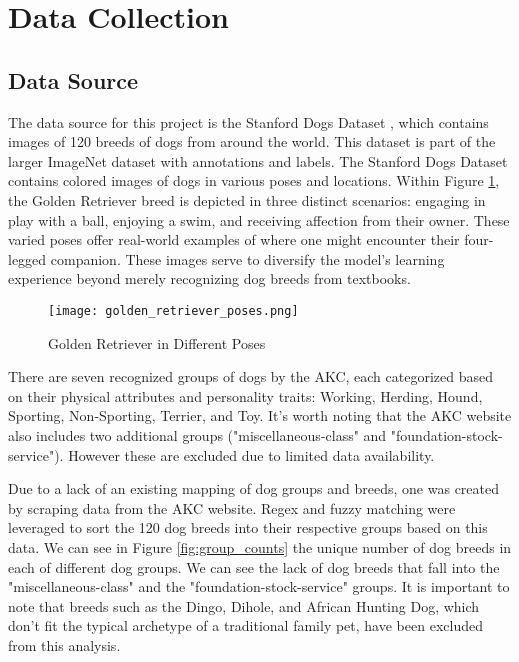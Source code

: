 \documentclass[11pt]{article}
\begin{document}

\section{Data Collection}

\subsection{Data Source}

The data source for this project is the Stanford Dogs Dataset \cite{data_source}, which contains images of 120 breeds of dogs from around the world. This dataset is part of the larger ImageNet dataset with annotations and labels. The Stanford Dogs Dataset contains colored images of dogs in various poses and locations. Within Figure \ref{fig:golden}, the Golden Retriever breed is depicted in three distinct scenarios: engaging in play with a ball, enjoying a swim, and receiving affection from their owner. These varied poses offer real-world examples of where one might encounter their four-legged companion. These images serve to diversify the model's learning experience beyond merely recognizing dog breeds from textbooks.

\begin{figure}[htb]
\centering
\texttt{[image: golden\_retriever\_poses.png]}
\caption{\label{fig:golden}Golden Retriever in Different Poses}
\end{figure}

\newpage

There are seven recognized groups of dogs by the AKC, each categorized based on their physical attributes and personality traits: Working, Herding, Hound, Sporting, Non-Sporting, Terrier, and Toy. It's worth noting that the AKC website also includes two additional groups ("miscellaneous-class" and "foundation-stock-service"). However these are excluded due to limited data availability.

Due to a lack of an existing mapping of dog groups and breeds, one was created by scraping data from the AKC website. Regex and fuzzy matching were leveraged to sort the 120 dog breeds into their respective groups based on this data. We can see in Figure \ref{fig:group_counts} the unique number of dog breeds in each of different dog groups. We can see the lack of dog breeds that fall into the "miscellaneous-class" and the "foundation-stock-service" groups. It is important to note that breeds such as the Dingo, Dihole, and African Hunting Dog, which don't fit the typical archetype of a traditional family pet, have been excluded from this analysis. 
\end{document}
